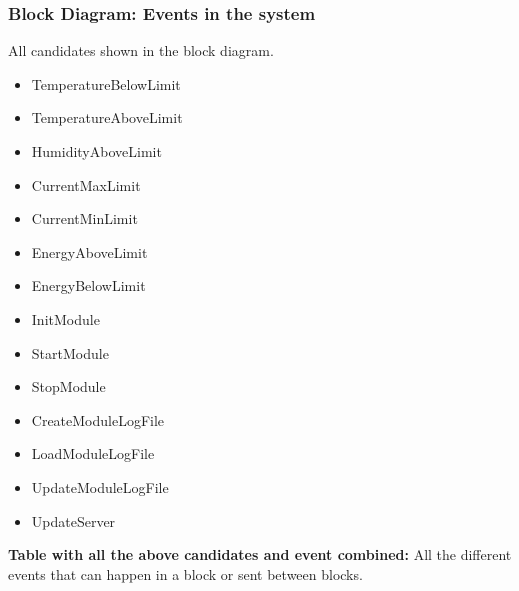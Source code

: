 \subsubsection{Block Diagram: Events in the system}
All candidates shown in the block diagram.
	\begin{itemize}
		\item TemperatureBelowLimit
		\item TemperatureAboveLimit
		\item HumidityAboveLimit
		\item CurrentMaxLimit
		\item CurrentMinLimit
		\item EnergyAboveLimit
		\item EnergyBelowLimit
		\item InitModule
		\item StartModule
		\item StopModule
		\item CreateModuleLogFile
		\item LoadModuleLogFile
		\item UpdateModuleLogFile
		\item UpdateServer
	\end{itemize}
\textbf{Table with all the above candidates and event combined:}
All the different events that can happen in a block or sent between blocks. 
